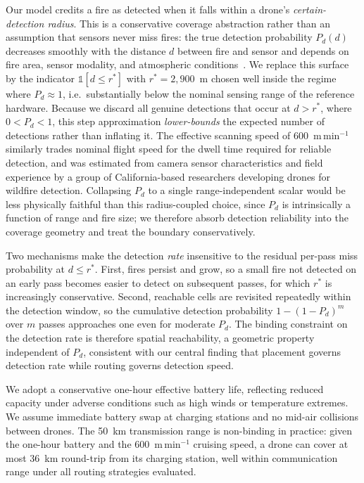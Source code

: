 \documentclass[pdflatex,sn-mathphys-num]{sn-jnl}%
\theoremstyle{thmstyleone}%
\theoremstyle{thmstyletwo}%
\theoremstyle{thmstylethree}%
\begin{document}
{\color{red} Our model credits a fire as detected when it falls within a drone's \emph{certain-detection radius}. This is a conservative coverage abstraction rather than an assumption that sensors never miss fires: the true detection probability $P_d(d)$ decreases smoothly with the distance $d$ between fire and sensor and depends on fire area, sensor modality, and atmospheric conditions~\cite{WildfireDetectionDLKim,WildfireDetectionDLKumar24,WildfireDetectionDLYang}. We replace this surface by the indicator $\mathbb{1}[d \le r^\ast]$ with $r^\ast = 2{,}900$~m chosen well inside the regime where $P_d \approx 1$, i.e.\ substantially below the nominal sensing range of the reference hardware. Because we discard all genuine detections that occur at $d > r^\ast$, where $0 < P_d < 1$, this step approximation \emph{lower-bounds} the expected number of detections rather than inflating it. The effective scanning speed of 600~m\,min$^{-1}$ similarly trades nominal flight speed for the dwell time required for reliable detection, and was estimated from camera sensor characteristics and field experience by a group of California-based researchers developing drones for wildfire detection. Collapsing $P_d$ to a single range-independent scalar would be less physically faithful than this radius-coupled choice, since $P_d$ is intrinsically a function of range and fire size; we therefore absorb detection reliability into the coverage geometry and treat the boundary conservatively.

Two mechanisms make the detection \emph{rate} insensitive to the residual per-pass miss probability at $d \le r^\ast$. First, fires persist and grow, so a small fire not detected on an early pass becomes easier to detect on subsequent passes, for which $r^\ast$ is increasingly conservative. Second, reachable cells are revisited repeatedly within the detection window, so the cumulative detection probability $1 - (1 - P_d)^{m}$ over $m$ passes approaches one even for moderate $P_d$. The binding constraint on the detection rate is therefore spatial reachability, a geometric property independent of $P_d$, consistent with our central finding that placement governs detection rate while routing governs detection speed.}
We adopt a conservative one-hour effective battery life, reflecting reduced capacity under adverse conditions such as high winds or temperature extremes. We assume immediate battery swap at charging stations and no mid-air collisions between drones. The 50~km transmission range is non-binding in practice: given the one-hour battery and the 600~m\,min$^{-1}$ cruising speed, a drone can cover at most 36~km round-trip from its charging station, well within communication range under all routing strategies evaluated.
\end{document}
